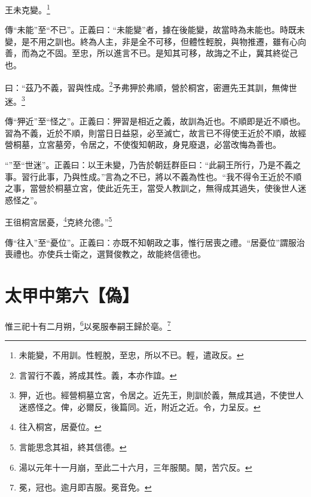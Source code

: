 王未克變。\footnote{未能變，不用訓。性輕脫，至忠，所以不已。輕，遣政反。}

{\noindent\zhuan{}\fzbyks 傳“未能”至“不已”。正義曰：“未能變”者，據在後能變，故當時為未能也。時既未變，是不用之訓也。終為人主，非是全不可移，但體性輕脫，與物推遷，雖有心向善，而為之不固。至忠，所以進言不已。是知其可移，故誨之不止，冀其終從己也。 \par}

曰：“茲乃不義，習與性成。\footnote{言習行不義，將成其性。義，本亦作誼。}予弗狎於弗順，營於桐宮，密邇先王其訓，無俾世迷。\footnote{狎，近也。經營桐墓立宮，令居之。近先王，則訓於義，無成其過，不使世人迷惑怪之。俾，必爾反，後篇同。近，附近之近。令，力呈反。}


{\noindent\zhuan{}\fzbyks 傳“狎近”至“怪之”。正義曰：狎習是相近之義，故訓為近也。不順即是近不順也。習為不義，近於不順，則當日日益惡，必至滅亡，故言已不得使王近於不順，故經營桐墓，立宮墓旁，令居之，不使復知朝政，身見廢退，必當改悔為善也。 \par}

{\noindent\shu{}\fzkt “”至“世迷”。正義曰：以王未變，乃告於朝廷群臣曰：“此嗣王所行，乃是不義之事。習行此事，乃與性成。”言為之不已，將以不義為性也。“我不得令王近於不順之事，當營於桐墓立宮，使此近先王，當受人教訓之，無得成其過失，使後世人迷惑怪之”。 \par}

王徂桐宮居憂，\footnote{往入桐宮，居憂位。}克終允德。”\footnote{言能思念其祖，終其信德。}

{\noindent\zhuan{}\fzbyks 傳“往入”至“憂位”。正義曰：亦既不知朝政之事，惟行居喪之禮。“居憂位”謂服治喪禮也。亦使兵士衛之，選賢俊教之，故能終信德也。 \par}

\section{太甲中第六【偽】}


惟三祀十有二月朔，\footnote{湯以元年十一月崩，至此二十六月，三年服闋。闋，苦穴反。}以冕服奉嗣王歸於亳。\footnote{冕，冠也。逾月即吉服。冕音免。}

